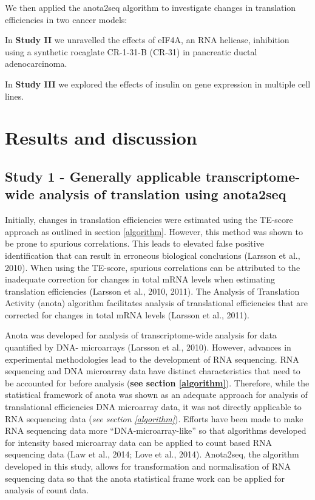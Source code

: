 \documentclass[12pt,openany]{book}
\begin{document}
We then applied the anota2seq algorithm to investigate changes in
translation efficiencies in two cancer models:

In \textbf{Study II} we unravelled the effects of eIF4A, an RNA
helicase, inhibition using a synthetic rocaglate CR-1-31-B (CR-31) in
pancreatic ductal adenocarcinoma.

In \textbf{Study III} we explored the effects of insulin on gene
expression in multiple cell lines.

\chapter{Results and discussion}

\section{Study 1 - Generally applicable transcriptome-wide analysis of translation using anota2seq}

Initially, changes in translation efficiencies were estimated using the
TE-score approach as outlined in section \ref{algorithm}. However, this
method was shown to be prone to spurious correlations. This leads to
elevated false positive identification that can result in erroneous
biological conclusions (Larsson et al., 2010). When using the TE-score,
spurious correlations can be attributed to the inadequate correction for
changes in total mRNA levels when estimating translation efficiencies
(Larsson et al., 2010, 2011). The Analysis of Translation Activity
(anota) algorithm facilitates analysis of translational efficiencies
that are corrected for changes in total mRNA levels (Larsson et al.,
2011).

Anota was developed for analysis of transcriptome-wide analysis for data
quantified by DNA- microarrays (Larsson et al., 2010). However, advances
in experimental methodologies lead to the development of RNA sequencing.
RNA sequencing and DNA microarray data have distinct characteristics
that need to be accounted for before analysis (\textbf{see section
\ref{algorithm}}). Therefore, while the statistical framework of anota
was shown as an adequate approach for analysis of translational
efficiencies DNA microarray data, it was not directly applicable to RNA
sequencing data (\emph{see section \ref{algorithm}}). Efforts have been
made to make RNA sequencing data more ``DNA-microarray-like'' so that
algorithms developed for intensity based microarray data can be applied
to count based RNA sequencing data (Law et al., 2014; Love et al.,
2014). Anota2seq, the algorithm developed in this study, allows for
transformation and normalisation of RNA sequencing data so that the
anota statistical frame work can be applied for analysis of count data.
\end{document}
